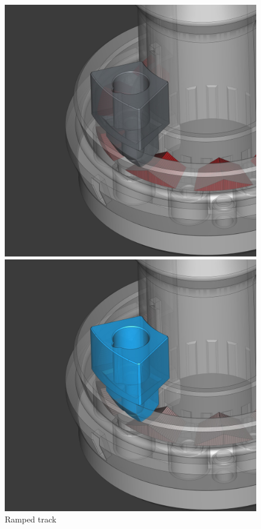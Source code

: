 \begin{figure}[!htb]
    \centering
    \begin{minipage}{.3333\textwidth}
        \centering
        \includegraphics[width=.9\linewidth]{images/cad_ramped_track.jpg}
        \caption{Ramped track}
        \label{fig:cad_ramped_track}
    \end{minipage}%
    \begin{minipage}{.3333\textwidth}
        \centering
        \includegraphics[width=.9\linewidth]{images/cad_rotator_head.jpg}

\end{minipage}
\end{figure}
